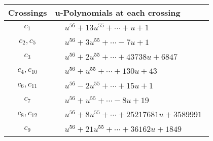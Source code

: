 \documentclass[1p]{elsarticle_modified}
\theoremstyle{definition}
\begin{document}
\begin{tabular}{m{50pt}|m{274pt}}
Crossings & \hspace{64pt}u-Polynomials at each crossing \\
\hline $$\begin{aligned}c_{1}\end{aligned}$$&$\begin{aligned}
&u^{56}+13 u^{55}+\cdots+u+1
\end{aligned}$\\
\hline $$\begin{aligned}c_{2},c_{5}\end{aligned}$$&$\begin{aligned}
&u^{56}+3 u^{55}+\cdots-7 u+1
\end{aligned}$\\
\hline $$\begin{aligned}c_{3}\end{aligned}$$&$\begin{aligned}
&u^{56}+2 u^{55}+\cdots+43738 u+6847
\end{aligned}$\\
\hline $$\begin{aligned}c_{4},c_{10}\end{aligned}$$&$\begin{aligned}
&u^{56}+u^{55}+\cdots+130 u+43
\end{aligned}$\\
\hline $$\begin{aligned}c_{6},c_{11}\end{aligned}$$&$\begin{aligned}
&u^{56}-2 u^{55}+\cdots+15 u+1
\end{aligned}$\\
\hline $$\begin{aligned}c_{7}\end{aligned}$$&$\begin{aligned}
&u^{56}+u^{55}+\cdots-8 u+19
\end{aligned}$\\
\hline $$\begin{aligned}c_{8},c_{12}\end{aligned}$$&$\begin{aligned}
&u^{56}+8 u^{55}+\cdots+25217681 u+3589991
\end{aligned}$\\
\hline $$\begin{aligned}c_{9}\end{aligned}$$&$\begin{aligned}
&u^{56}+21 u^{55}+\cdots+36162 u+1849
\end{aligned}$\\
\hline
\end{tabular}\\~\\
\end{document}
